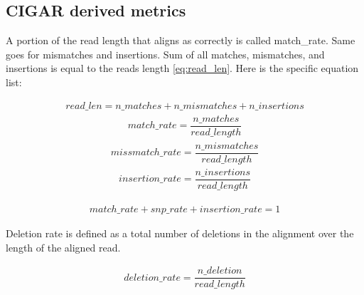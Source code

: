 \documentclass[runningheads,a4paper]{llncs}
\begin{document}
\subsection{CIGAR derived metrics}
\label{app:evaluation:CIGAR}

A portion of the read length that aligns as correctly is called match\_rate. Same goes for mismatches and insertions.
Sum of all matches, mismatches, and insertions is equal to the reads length \ref{eq:read_len}.
Here is the specific equation list:

\begin{equation}
\begin{gathered}
\label{eq:read_len}
read\_len =  n\_matches + n\_mismatches + n\_insertions
\end{gathered}
\end{equation}
\begin{equation}
\begin{gathered}
match\_rate = \dfrac{n\_matches}{read\_length}
\end{gathered}
\end{equation}
\begin{equation}
\begin{gathered}
missmatch\_rate = \dfrac{n\_mismatches}{read\_length}
\end{gathered}
\end{equation}
\begin{equation}
\begin{gathered}
insertion\_rate = \dfrac{n\_insertions}{read\_length}
\end{gathered}
\end{equation}

\begin{equation}
\begin{gathered}
match\_rate  + snp\_rate + insertion\_rate = 1
\end{gathered}
\end{equation}

Deletion rate is defined as a total number of deletions in the alignment over the length of the aligned read.

\begin{equation}
\begin{gathered}
deletion\_rate = \dfrac{n\_deletion}{read\_length}
\end{gathered}
\end{equation}
\end{document}
